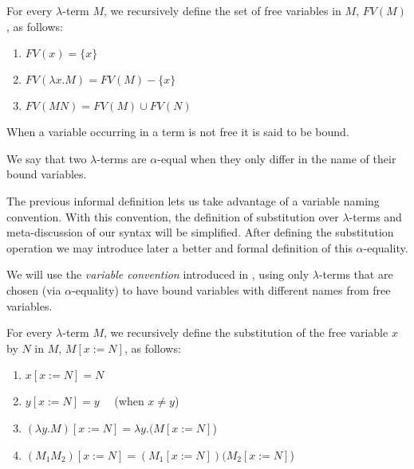 \begin{definition}
  For every $\lambda$-term $M$, we recursively define the set of free variables in $M$, $FV(M)$, as follows:
  
  \begin{enumerate}
  \item $FV( x ) = \{ x \}$
  \item $FV( \lambda x . M ) = FV(M) - \{ x \}$
  \item $FV( M N ) = FV(M) \cup FV(N)$
  \end{enumerate}

  When a variable occurring in a term is not free it is said to be bound.
\end{definition}


\begin{definition}
  We say that two $\lambda$-terms are $\alpha$-equal when they only differ in the name of their bound variables.
\end{definition}

\begin{remark}
  The previous informal definition lets us take advantage of a variable naming convention.
  With this convention, the definition of substitution over $\lambda$-terms and meta-discussion of our syntax will be simplified.
  After defining the substitution operation we may introduce later a better and formal definition of this $\alpha$-equality.
\end{remark}

\begin{convention} 
  We will use the \textit{variable convention} introduced in \cite{Barendregt1987}, using only $\lambda$-terms that are chosen (via $\alpha$-equality) to have bound variables with different names from free variables.
\end{convention}

\begin{definition}[Substitution]
  For every $\lambda$-term $M$, we recursively define the substitution of the free variable $x$ by $N$ in $M$, $M[x := N]$, as follows:
  
  \begin{enumerate}
  \item $x[x := N] = N$
  \item $y[x := N] = y \quad$ (when $x \neq y$)
  \item $(\lambda y . M)[x := N] = \lambda y . (M[x := N]$)
  \item $(M_1 M_2)[x := N] = (M_1[x := N]) (M_2[x := N]$)
  \end{enumerate}

\end{definition}

